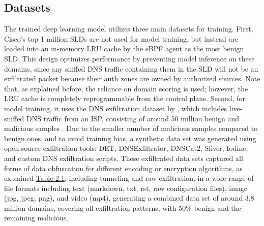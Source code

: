 \documentclass [11pt, proquest] {uwthesis}[2020/02/24]
\begin{document}
\subsection{Datasets}
\label{sec:dataset}
The trained deep learning model utilizes three main datasets for training. First, Cisco’s top 1 million SLDs are not used for model training, but instead are loaded into an in-memory LRU cache by the eBPF agent as the most benign SLD. This design optimizes performance by preventing model inference on these domains, since any sniffed DNS traffic containing them in the SLD will not be an exfiltrated packet because their auth zones are owned by authorized sources. Note that, as explained before, the reliance on domain scoring is used; however, the LRU cache is completely reprogrammable from the control plane. Second, for model training, it uses the DNS exfiltration dataset by \citeauthor{ziza2023dns}, which includes live-sniffed DNS traffic from an ISP, consisting of around 50 million benign and malicious samples \cite{ziza2023dns}. Due to the smaller number of malicious samples compared to benign ones, and to avoid training bias, a synthetic data set was generated using open-source exfiltration tools: DET, DNSExfiltrator, DNSCat2, Sliver, Iodine, and custom DNS exfiltration scripts. These exfiltrated data sets captured all forms of data obfuscation for different encoding or encryption algorithms, as explained \hyperref[dns_payload_obfuscation]{Table 2.1}, including tunneling and raw exfiltration, in a wide range of file formats including text (markdown, txt, rst, raw configuration files), image (jpg, jpeg, png), and video (mp4), generating a combined data set of around 3.8 million domains, covering all exfiltration patterns, with 50\% benign and the remaining malicious.


\begin{table}[ht]
\centering
{}
\caption{DNS Features in Kernel}
\label{sec:feature-kernel}
\end{table}
\end{document}
